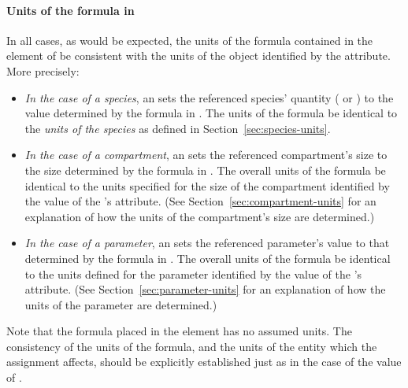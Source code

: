 \paragraph{Units of the  formula in }

In all cases, as would be expected, the units of the formula
contained in the  element of
\EventAssignment {} be consistent with the units of the object
identified by the  attribute.  More
precisely:
\begin{itemize}
  
\item \emph{In the case of a species}, an \EventAssignment sets
  the referenced species' quantity ( or
  ) to the value determined by the
  formula in .  The units of the  formula
   be identical to the \emph{units of the species} as defined
  in Section~\ref{sec:species-units}.
  
\item \emph{In the case of a compartment}, an \EventAssignment
  sets the referenced compartment's size to the size determined by
  the formula in .  The overall units of the formula
   be identical to the units specified for the size of the
  compartment identified by the value of the \EventAssignment's
   attribute.  (See
  Section~\ref{sec:compartment-units} for an explanation of how
  the units of the compartment's size are determined.)
  
\item \emph{In the case of a parameter}, an \EventAssignment sets
  the referenced parameter's value to that determined by the
  formula in .  The overall units of the formula 
  be identical to the units defined for the parameter identified
  by the value of the \EventAssignment's 
  attribute.  (See Section~\ref{sec:parameter-units} for
  an explanation of how the units of the parameter are
  determined.)

\end{itemize}

\begin{blockChanged}

Note that the formula placed in the  element
has no assumed units.  The consistency of the units of the
formula, and the units of the entity which the assignment affects,
should be explicitly established just as in the case of the value of
.

\end{blockChanged}


